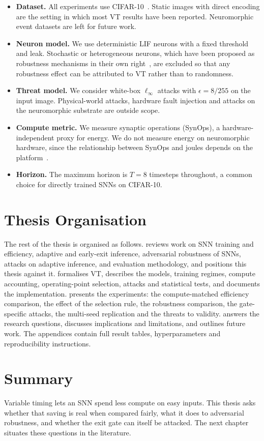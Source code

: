 \begin{itemize}
    \item \textbf{Dataset.} All experiments use CIFAR-10~\cite{krizhevsky2009learning}. Static images with direct encoding are the setting in which most VT results have been reported. Neuromorphic event datasets are left for future work.
    \item \textbf{Neuron model.} We use deterministic LIF neurons with a fixed threshold and leak. Stochastic or heterogeneous neurons, which have been proposed as robustness mechanisms in their own right~\cite{wang2025random}, are excluded so that any robustness effect can be attributed to VT rather than to randomness.
    \item \textbf{Threat model.} We consider white-box $\ell_\infty$ attacks with $\epsilon = 8/255$ on the input image. Physical-world attacks, hardware fault injection and attacks on the neuromorphic substrate are outside scope.
    \item \textbf{Compute metric.} We measure synaptic operations (SynOps), a hardware-independent proxy for energy. We do not measure energy on neuromorphic hardware, since the relationship between SynOps and joules depends on the platform~\cite{dampfhoffer2023snns}.
    \item \textbf{Horizon.} The maximum horizon is $T = 8$ timesteps throughout, a common choice for directly trained SNNs on CIFAR-10.
\end{itemize}

\section{Thesis Organisation}
\label{sec:intro-org}

The rest of the thesis is organised as follows.  reviews work on SNN training and efficiency, adaptive and early-exit inference, adversarial robustness of SNNs, attacks on adaptive inference, and evaluation methodology, and positions this thesis against it.  formalises VT, describes the models, training regimes, compute accounting, operating-point selection, attacks and statistical tests, and documents the implementation.  presents the experiments: the compute-matched efficiency comparison, the effect of the selection rule, the robustness comparison, the gate-specific attacks, the multi-seed replication and the threats to validity.  answers the research questions, discusses implications and limitations, and outlines future work. The appendices contain full result tables, hyperparameters and reproducibility instructions.

\section{Summary}

Variable timing lets an SNN spend less compute on easy inputs. This thesis asks whether that saving is real when compared fairly, what it does to adversarial robustness, and whether the exit gate can itself be attacked. The next chapter situates these questions in the literature.

